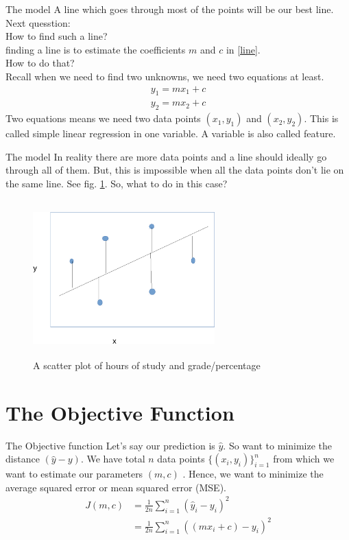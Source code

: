 \documentclass[blue]{beamer}
\begin{document}
\begin{frame}{The model}
A line which goes through most of the points will be our best line. Next quesstion:\\
How to find such a line? \\

finding a line is to estimate the coefficients $m$ and $c$ in \eqref{line}. \\
How to do that?\\
Recall when we need to find two unknowns, we need two equations at least. \\
\begin{align*}
y_1 = mx_1 +c \\
y_2 = mx_2 +c
\end{align*}
Two equations means we need two data points $(x_1,y_1)$ and $(x_2,y_2)$. This is called simple linear regression in one variable.  A variable is also called \alert{feature}.
\end{frame}

\begin{frame}{The model}
In reality there are more data points and a line should ideally go through all of them. But, this is impossible when all the data points don't lie on the same line. See fig. \ref{linear}. So, what to do in this case?
\begin{figure}
\centering
\includegraphics[width=7cm,height=6cm]{error-crop.pdf}
\caption{A scatter plot of hours of study and grade/percentage}
\label{linear}
\end{figure}
\end{frame}
\section{The Objective Function}


\begin{frame}{The Objective function}
Let's say our prediction is $\hat{y}$. So want to minimize the distance $(\hat{y}-y)$.  We have total $n$ data points $\{(x_i,y_i)\}_{i=1}^n$ from which we want to estimate our parameters $(m,c)$ . Hence, we want to minimize the \alert{average squared error} or \alert{mean squared error} (MSE).
\begin{align*}
J(m,c) & =\frac{1}{2n} \sum_{i=1}^n (\hat{y}_i-y_i)^2\\
&=\frac{1}{2n} \sum_{i=1}^n ((mx_i+c)-y_i)^2
\end{align*}
\end{frame}
\end{document}
